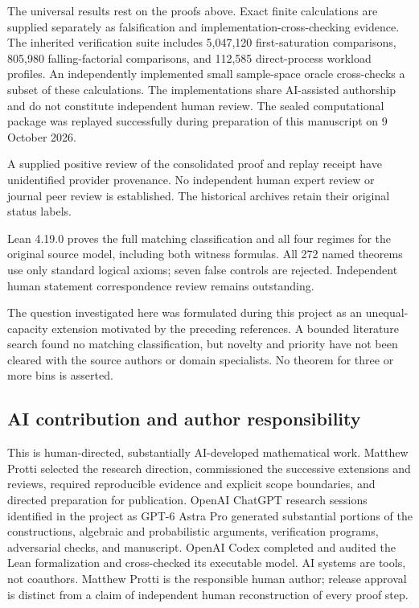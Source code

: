 The universal results rest on the proofs above. Exact finite calculations are supplied separately as falsification and implementation-cross-checking evidence. The inherited verification suite includes 5,047,120 first-saturation comparisons, 805,980 falling-factorial comparisons, and 112,585 direct-process workload profiles. An independently implemented small sample-space oracle cross-checks a subset of these calculations. The implementations share AI-assisted authorship and do not constitute independent human review. The sealed computational package was replayed successfully during preparation of this manuscript on 9 October 2026.

A supplied positive review of the consolidated proof and replay receipt have unidentified provider provenance. No independent human expert review or journal peer review is established. The historical archives retain their original status labels.

Lean 4.19.0 proves the full matching classification and all four regimes for the original source model, including both witness formulas. All 272 named theorems use only standard logical axioms; seven false controls are rejected. Independent human statement correspondence review remains outstanding.

The question investigated here was formulated during this project as an unequal-capacity extension motivated by the preceding references. A bounded literature search found no matching classification, but novelty and priority have not been cleared with the source authors or domain specialists. No theorem for three or more bins is asserted.

\subsection{AI contribution and author responsibility}\label{ai-contribution-and-author-responsibility}

This is human-directed, substantially AI-developed mathematical work. Matthew Protti selected the research direction, commissioned the successive extensions and reviews, required reproducible evidence and explicit scope boundaries, and directed preparation for publication. OpenAI ChatGPT research sessions identified in the project as GPT-6 Astra Pro generated substantial portions of the constructions, algebraic and probabilistic arguments, verification programs, adversarial checks, and manuscript. OpenAI Codex completed and audited the Lean formalization and cross-checked its executable model. AI systems are tools, not coauthors. Matthew Protti is the responsible human author; release approval is distinct from a claim of independent human reconstruction of every proof step.

